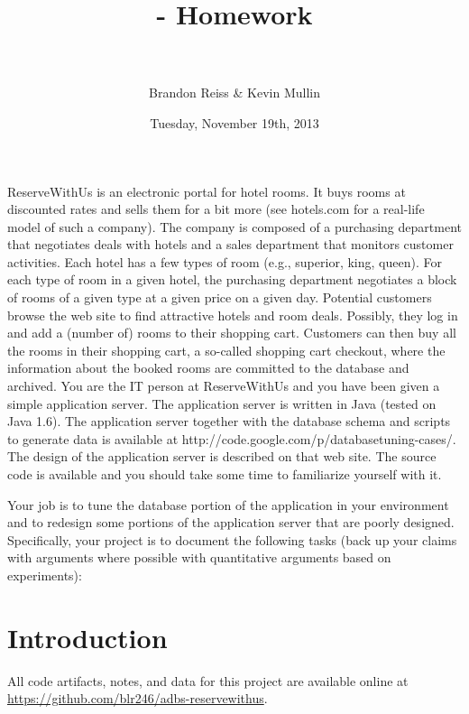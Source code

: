 \documentclass[letterpaper]{article}%
\author{%
  Brandon Reiss \& Kevin Mullin
}
\date{Tuesday, November 19th, 2013}
\title{%
  \CourseTitle{} - Homework \HomeworkSetNumber{} \\
  {\large \Instructor{}} \\
  {\large \CourseNumber{}}
}
\begin{document}
\noindent
\maketitle
\thispagestyle{empty}

\begin{problemcopy}
ReserveWithUs is an electronic portal for hotel rooms. It buys rooms at
discounted rates and sells them for a bit more (see hotels.com for a real-life
model of such a company). The company is composed of a purchasing department
that negotiates deals with hotels and a sales department that monitors customer
activities. Each hotel has a few types of room (e.g., superior, king, queen).
For each type of room in a given hotel, the purchasing department negotiates a
block of rooms of a given type at a given price on a given day. Potential
customers browse the web site to find attractive hotels and room deals.
Possibly, they log in and add a (number of) rooms to their shopping cart.
Customers can then buy all the rooms in their shopping cart, a so-called
shopping cart checkout, where the information about the booked rooms are
committed to the database and archived. You are the IT person at ReserveWithUs
and you have been given a simple application server. The application server is
written in Java (tested on Java 1.6). The application server together with the
database schema and scripts to generate data is available at
http://code.google.com/p/databasetuning-cases/. The design of the application
server is described on that web site. The source code is available and you
should take some time to familiarize yourself with it.

Your job is to tune the database portion of the application in your environment
and to redesign some portions of the application server that are poorly
designed. Specifically, your project is to document the following tasks (back
up your claims with arguments where possible with quantitative arguments based
on experiments):
\end{problemcopy}

\def\RWUApp{\texttt{ReserveWithUsApp}}

\section{Introduction}

All code artifacts, notes, and data for this project are available online at \\
\url{https://github.com/blr246/adbs-reservewithus}.
\end{document}

